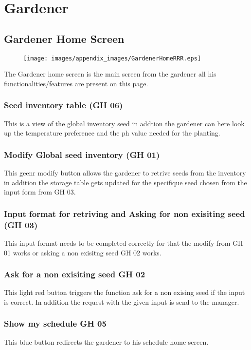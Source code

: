 \chapter{Gardener}
\label{chap:appendix_Gardener}

\section{Gardener Home Screen}
\label{sec:appendix_Gardener_Home_Screen}

\begin{figure}[H]
\texttt{[image: images/appendix\_images/GardenerHomeRRR.eps]}
\end{figure}

The Gardener home screen is the main screen from the gardener all his
functionalities/features are present on this page.


\subsection{Seed inventory table (GH 06)}
This is a view of the global inventory seed in addtion the gardener can here
look up the temperature preference and the ph value needed for the planting.

\subsection{Modify Global seed inventory (GH 01)}
This geenr modify button allows the gardener to retrive seeds from the
inventory in addition the storage table gets updated for the specifique seed 
chosen from the input form from GH 03.

\subsection{Input format for retriving and Asking for non exisiting seed (GH
03)} This input format needs to be completed correctly for that the modify from
GH 01 works or asking a non exisitng seed GH 02 works.

\subsection{Ask for a non exisiting seed GH 02}
This light red button triggers the function ask for a non exising seed if the
input is correct. In addition the request with the given input is send to the
manager.

\subsection{Show my schedule GH 05}
This blue button redirects the gardener to his schedule home screen.


